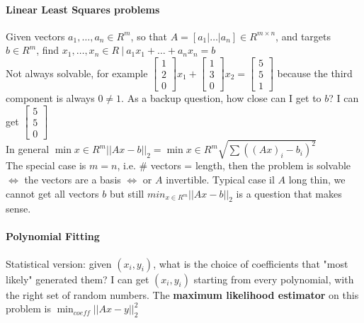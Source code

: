 \documentclass[10pt]{report}
\begin{document}
\paragraph{Linear Least Squares problems} Given vectors $a_1,\ldots,a_n\in R^m$, so that $A = [a_1|\ldots|a_n]\in R^{m\times n}$, and targets $b\in R^m$, find $x_1,\ldots,x_n\in R\:|\: a_1x_1 + \ldots + a_n x_n = b$\\
Not always solvable, for example $\left[\begin{array}{c}
1\\2\\0
\end{array}\right]x_1 + \left[\begin{array}{c}
1\\3\\0
\end{array}\right]x_2 = \left[\begin{array}{c}
5\\5\\1
\end{array}\right]$ because the third component is always $0 \neq 1$. As a backup question, how close can I get to $b$? I can get $\left[\begin{array}{c}
5\\5\\0
\end{array}\right]$\\
In general $\min{x\in R^m} ||Ax - b||_2 = \min{x\in R^m} \sqrt{\sum ((Ax)_i - b_i)^2}$\\
The special case is $m=n$, i.e. \# vectors = length, then the problem is solvable $\Leftrightarrow$ the vectors are a basis $\Leftrightarrow$ or $A$ invertible. Typical case il $A$ long thin, we cannot get all vectors $b$ but still $min_{x\in R^m} ||Ax - b||_2$ is a question that makes sense. 
\paragraph{Polynomial Fitting} Statistical version: given $(x_i, y_i)$, what is the choice of coefficients that "most likely" generated them? I can get $(x_i, y_i)$ starting from every polynomial, with the right set of random numbers. The \textbf{maximum likelihood estimator} on this problem is $\min_{coeff}||Ax - y||_2^2$
\end{document}
